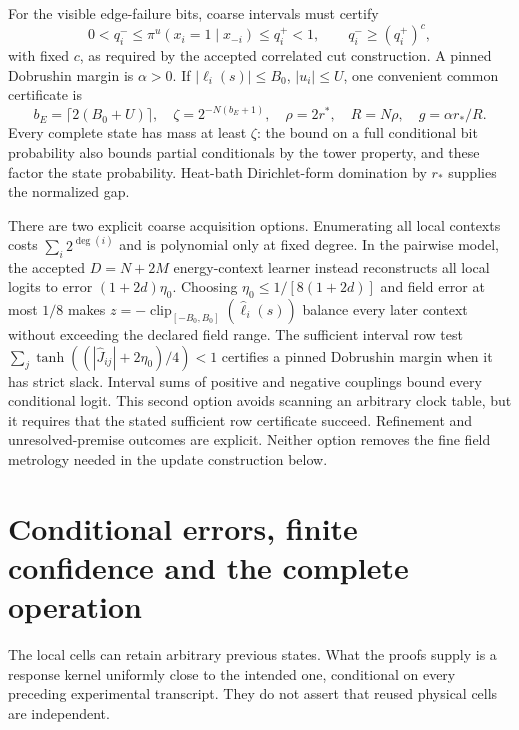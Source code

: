 For the visible edge-failure bits, coarse intervals must certify
\begin{equation}\label{eq:contrast}
0<q_i^-\le\pi^u(x_i=1\mid x_{-i})\le q_i^+<1,
\qquad q_i^-\ge(q_i^+)^c,
\end{equation}
with fixed $c$, as required by the accepted correlated cut construction.
A pinned Dobrushin margin is $\alpha>0$. If
$|\ell_i(s)|\le B_0$, $|u_i|\le U$, one convenient common certificate is
\begin{equation}\label{eq:gap}
b_E=\lceil2(B_0+U)\rceil,\quad
\zeta=2^{-N(b_E+1)},\quad
\rho=2r^*,\quad R=N\rho,\quad g=\alpha r_*/R.
\end{equation}
Every complete state has mass at least $\zeta$: the bound on a full
conditional bit probability also bounds partial conditionals by the
tower property, and these factor the state probability. Heat-bath
Dirichlet-form domination by $r_*$ supplies the normalized gap.

There are two explicit coarse acquisition options. Enumerating all
local contexts costs $\sum_i2^{\deg(i)}$ and is polynomial only at
fixed degree. In the pairwise model, the accepted $D=N+2M$ energy-context
learner instead reconstructs all local logits to error
$(1+2d)\eta_0$. Choosing
$\eta_0\le1/[8(1+2d)]$ and field error at most $1/8$ makes
$z=-\operatorname{clip}_{[-B_0,B_0]}(\widehat\ell_i(s))$ balance every
later context without exceeding the declared field range. The sufficient
interval row test
$\sum_j\tanh((|\widehat J_{ij}|+2\eta_0)/4)<1$
certifies a pinned Dobrushin margin when it has strict slack. Interval
sums of positive and negative couplings bound every conditional logit.
This second option avoids scanning an arbitrary clock table, but it
requires that the stated sufficient row certificate succeed. Refinement
and unresolved-premise outcomes are explicit. Neither option removes
the fine field metrology needed in the update construction below.





\section{Conditional errors, finite confidence and the complete operation}
The local cells can retain arbitrary previous states. What the proofs
supply is a response kernel uniformly close to the intended one,
conditional on every preceding experimental transcript. They do not
assert that reused physical cells are independent.

